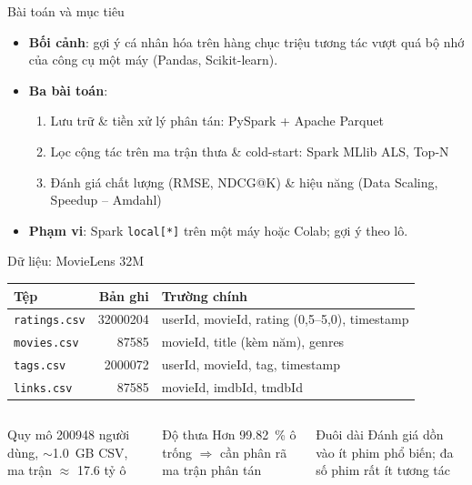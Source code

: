 

\begin{frame}{Bài toán và mục tiêu}
  \begin{itemize}
    \item \textbf{Bối cảnh}: gợi ý cá nhân hóa trên hàng chục triệu tương tác vượt quá bộ nhớ của
      công cụ một máy (Pandas, Scikit-learn).
    \item \textbf{Ba bài toán}:
    \begin{enumerate}
      \item Lưu trữ \& tiền xử lý phân tán: PySpark + Apache Parquet
      \item Lọc cộng tác trên ma trận thưa \& cold-start: Spark MLlib ALS, Top-N
      \item Đánh giá chất lượng (RMSE, NDCG@K) \& hiệu năng (Data Scaling, Speedup -- Amdahl)
    \end{enumerate}
    \item \textbf{Phạm vi}: Spark \texttt{local[*]} trên một máy hoặc Colab; gợi ý theo lô.
  \end{itemize}
\end{frame}

\begin{frame}{Dữ liệu: MovieLens 32M}
  \centering\small
  \begin{tabular}{l r l}
    \toprule
    \textbf{Tệp} & \textbf{Bản ghi} & \textbf{Trường chính} \\
    \midrule
    \texttt{ratings.csv} & \num{32000204} & userId, movieId, rating (0,5--5,0), timestamp \\
    \texttt{movies.csv}  & \num{87585}    & movieId, title (kèm năm), genres \\
    \texttt{tags.csv}    & \num{2000072}  & userId, movieId, tag, timestamp \\
    \texttt{links.csv}   & \num{87585}    & movieId, imdbId, tmdbId \\
    \bottomrule
  \end{tabular}
  \par\bigskip
  \begin{columns}[T]
    \begin{block}{Quy mô}
      \num{200948} người dùng, $\sim$\SI{1,0}{GB} CSV, ma trận $\approx$ \num{17,6} tỷ ô
    \end{block}
    \begin{block}{Độ thưa}
      Hơn \SI{99,82}{\percent} ô trống $\Rightarrow$ cần phân rã ma trận phân tán
    \end{block}
    \begin{block}{Đuôi dài}
      Đánh giá dồn vào ít phim phổ biến; đa số phim rất ít tương tác
    \end{block}
  \end{columns}
\end{frame}

